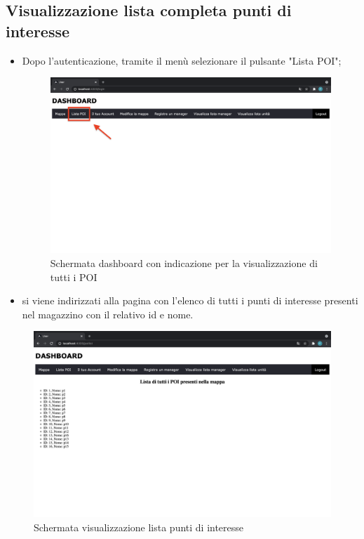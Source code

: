 \subsection{Visualizzazione lista completa punti di interesse}
\begin{itemize}
    \item Dopo l'autenticazione, tramite il menù selezionare il pulsante "Lista POI";
    \begin{figure}[H]
        \centering
        \includegraphics[scale=0.2]{res/images/dashboard2.png}
        \caption{Schermata dashboard con indicazione per la visualizzazione di tutti i POI}
    \end{figure}
    \item si viene indirizzati alla pagina con l'elenco di tutti i punti di interesse presenti nel magazzino con il relativo id e nome.

\end{itemize}

\begin{figure}[H]
    \centering
    \includegraphics[scale=0.2]{res/images/listpoi_user.png}
    \caption{Schermata visualizzazione lista punti di interesse}
\end{figure}

